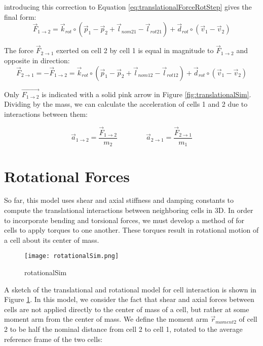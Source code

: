 {introducing this correction to Equation \ref{eq:translationalForceRotStep} gives the final form:
 \begin{equation} \label{eq:translationalForceRot}
  \vec{F}_{1\rightarrow2} = \vec{k}_{rot} \circ (\vec{p}_1 - \vec{p}_2 + \vec{l}_{nom21}-\vec{l}_{rot21}) + \vec{d}_{rot} \circ (\vec{v}_1 - \vec{v}_2)
  \end{equation}

The force $\vec{F}_{2\rightarrow1}$ exerted on cell 2 by cell 1 is equal in magnitude to $\vec{F}_{1\rightarrow2}$ and opposite in direction:
 \begin{equation} \label{eq:translationalEqOpp}
  \vec{F}_{2\rightarrow1} = -\vec{F}_{1\rightarrow2} = \vec{k}_{rot} \circ (\vec{p}_1 - \vec{p}_2 + \vec{l}_{nom12}-\vec{l}_{rot12}) + \vec{d}_{rot} \circ (\vec{v}_1 - \vec{v}_2)
  \end{equation}

Only $\vec{F_{1\rightarrow2}}$ is indicated with a solid pink arrow in Figure \ref{fig:translationalSim}.\\

Dividing by the mass, we can calculate the acceleration of cells 1 and 2 due to interactions between them:

 \[ \vec{a}_{1\rightarrow2} = \dfrac{\vec{F}_{1\rightarrow2}}{m_2} 
  \qquad\qquad
   \vec{a}_{2\rightarrow1} = \dfrac{\vec{F}_{2\rightarrow1}}{m_1} 
  \]

\section{Rotational Forces}

So far, this model uses shear and axial stiffness and damping constants to compute the translational interactions between neighboring cells in 3D.  In order to incorporate bending and torsional forces, we must develop a method of for cells to apply torques to one another.  These torques result in rotational motion of a cell about its center of mass.\\

\begin{figure}
  \texttt{[image: rotationalSim.png]}
  \caption{rotationalSim}
  \label{fig:rotationalSim}
\end{figure}

A sketch of the translational and rotational model for cell interaction is shown in Figure \ref{fig:rotationalSim}.  In this model, we consider the fact that shear and axial forces between cells are not applied directly to the center of mass of a cell, but rather at some moment arm from the center of mass.  We define the moment arm $\vec{r}_{moment2}$ of cell 2 to be half the nominal distance from cell 2 to cell 1, rotated to the average reference frame of the two cells:

}

